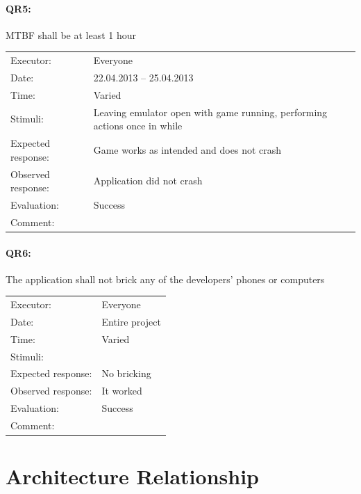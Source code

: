 \documentclass[12pt, a4paper]{article}
\begin{document}
\paragraph{QR5:} MTBF shall be at least 1 hour\\
\begin{tabular}{  p{}  p{} }
    Executor: & Everyone \\
    Date: & 22.04.2013 – 25.04.2013 \\
    Time: & Varied \\
    Stimuli: & Leaving emulator open with game running, performing actions once in  while \\
    Expected response: & Game works as intended and does not crash \\
    Observed response: & Application did not crash \\
    Evaluation: & Success \\
    Comment: &  \\
\end{tabular}

\paragraph{QR6:} The application shall not brick any of the developers' phones
or computers \\
\begin{tabular}{  p{}  p{} }
    Executor: & Everyone \\
    Date: & Entire project \\
    Time: & Varied \\
    Stimuli: &  \\
    Expected response: & No bricking \\
    Observed response: & It worked \\
    Evaluation: & Success \\
    Comment: &  \\
\end{tabular}

\section{Architecture Relationship}
\end{document}
